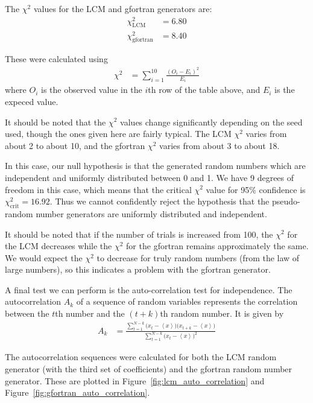 \documentclass[twocolumn]{myarticle}
\begin{document}
The $ \chi^2 $ values for the LCM and gfortran generators are:
\begin{align}
    \chi_{\text{LCM}}^2 &= 6.80
    \\
    \chi_{\text{gfortran}}^2 &= 8.40
\end{align}

These were calculated using 
\begin{align}
    \chi^2 &= \sum_{i=1}^{10} \frac{(O_i - E_i)^2}{E_i}
\end{align}
where $ O_i $ is the observed value in the $ i $th row of the table above, and $ E_i $ is the expeced value. 

It should be noted that the $ \chi^2 $ values change significantly depending on the seed used, though the ones given here are fairly typical.
The LCM $ \chi^2 $ varies from about 2 to about 10, and the gfortran $ \chi^2 $ varies from about 3 to about 18.

In this case, our null hypothesis is that the generated random numbers which are independent and uniformly distributed between 0 and 1.
We have 9 degrees of freedom in this case, which means that the critical $ \chi^2 $ value for 95\% confidence is $ \chi_{\text{crit}}^2 = 16.92 $.
Thus we cannot confidently reject the hypothesis that the pseudo-random number generators are uniformly distributed and independent.

It should be noted that if the number of trials is increased from 100, the $ \chi^2 $ for the LCM decreases while the $ \chi^2 $ for the gfortran remains approximately the same.
We would expect the $ \chi^2 $ to decrease for truly random numbers (from the law of large numbers), so this indicates a problem with the gfortran generator.

A final test we can perform is the auto-correlation test for independence.
The autocorrelation $ A_k $ of a sequence of random variables represents the correlation between the $ t $th number and the $ (t+k) $th random number.
It is given by
\begin{align}
    A_k &= \frac{\displaystyle \sum_{t=1}^{N-k}\big(x_t - \left\langle x \right\rangle\big)\big( x_{t+k} - \left\langle x \right\rangle \big)}{\displaystyle \sum_{t=1}^{N-k} \big( x_t - \left\langle x \right\rangle \big)^2}
\end{align}

The autocorrelation sequences were calculated for both the LCM random generator (with the third set of coefficients) and the gfortran random number generator.
These are plotted in Figure~\ref{fig:lcm_auto_correlation} and Figure~\ref{fig:gfortran_auto_correlation}.
\end{document}
